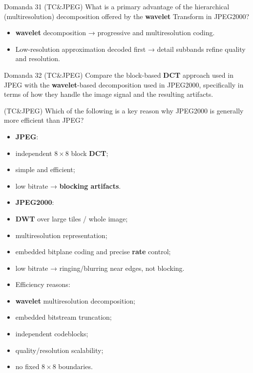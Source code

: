 \begin{questionbox}{Domanda 31}
(TC\&JPEG) What is a primary advantage of the hierarchical (multiresolution) decomposition offered by the \textbf{wavelet} Transform in JPEG2000?
\end{questionbox}


\begin{itemize}
  \item \textbf{wavelet} decomposition → progressive and multiresolution coding.
  \item Low-resolution approximation decoded first → detail subbands refine quality and resolution.
\end{itemize}



\begin{questionbox}{Domanda 32}
(TC\&JPEG) Compare the block-based \textbf{DCT} approach used in JPEG with the \textbf{wavelet}-based decomposition used in JPEG2000, specifically in terms of how they handle the image signal and the resulting artifacts.

(TC\&JPEG) Which of the following is a key reason why JPEG2000 is generally more efficient than JPEG?
\end{questionbox}


\begin{itemize}
  \item \textbf{JPEG}:
  \item independent $8\times8$ block \textbf{DCT};
  \item simple and efficient;
  \item low bitrate → \textbf{blocking artifacts}.
  \item \textbf{JPEG2000}:
  \item \textbf{DWT} over large tiles / whole image;
  \item multiresolution representation;
  \item embedded bitplane coding and precise \textbf{rate} control;
  \item low bitrate → ringing/blurring near edges, not blocking.
  \item Efficiency reasons:
  \item \textbf{wavelet} multiresolution decomposition;
  \item embedded bitstream truncation;
  \item independent codeblocks;
  \item quality/resolution scalability;
  \item no fixed $8\times8$ boundaries.
\end{itemize}



